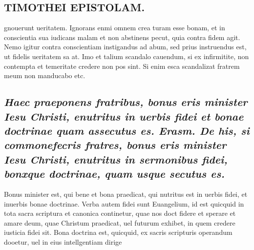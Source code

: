 \documentclass{article}
\begin{document}
\begin{pages}
\section*{TIMOTHEI EPISTOLAM. }
\marginpar{[ p.101 ]}\pstart gnouerunt ueritatem. Ignorans enmi omnem crea turam esse bonam, et in conscientia sua iudicans malam et non abstinens pecut, quia contra fidem agit. Nemo igitur contra conscientiam instigandus ad abum, sed prius instruendus est, ut fidelis ueritatem sa at. Imo et talium scandalo cauendum, si ex infirmitite, non contempta et temeritate credere non pos sint. Si enim esca scandalizat fratrem meum non manducabo etc.  \pend
{}
{}
\subsection*{\textit{Haec praeponens fratribus, bonus eris minister Iesu Christi, enutritus in uerbis fidei et bonae doctrinae quam assecutus es. Erasm. De his, si commonefecris fratres, bonus eris minister Iesu Christi, enutritus in sermonibus fidei, bonxque doctrinae, quam usque secutus es. }}\pstart Bonus minister est, qui bene et bona praedicat, qui nutritus est in uerbis fidei, et inuerbis bonae doctrinae. Verba autem fidei sunt Euangelium, id est quicquid in tota sacra scriptura et canonica continetur, quae nos doct fidere et sperare et amare deum, quae Christum praedicat, uel futurum exhibet, in quem credere iusticia fidei sit.  \pend\pstart Bona doctrina est, quicquid, ex sacris scripturis operandum dooetur, uel in eius intellgentiam dirige  \pend

\end{pages}
\end{document}
